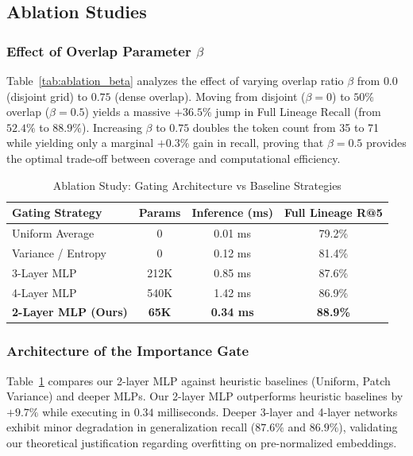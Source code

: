 \documentclass[journal]{IEEEtran}
\begin{document}
\subsection{Ablation Studies}

\subsubsection{Effect of Overlap Parameter $\beta$}
Table~\ref{tab:ablation_beta} analyzes the effect of varying overlap ratio $\beta$ from $0.0$ (disjoint grid) to $0.75$ (dense overlap). Moving from disjoint ($\beta=0$) to $50\%$ overlap ($\beta=0.5$) yields a massive $+36.5\%$ jump in Full Lineage Recall (from $52.4\%$ to $88.9\%$). Increasing $\beta$ to $0.75$ doubles the token count from 35 to 71 while yielding only a marginal $+0.3\%$ gain in recall, proving that $\beta = 0.5$ provides the optimal trade-off between coverage and computational efficiency.

\begin{table}[t]
\centering
\caption{Ablation Study: Gating Architecture vs Baseline Strategies}
\label{tab:ablation_gating}
\begin{tabular}{lccc}
\toprule
\textbf{Gating Strategy} & \textbf{Params} & \textbf{Inference (ms)} & \textbf{Full Lineage R@5} \\
\midrule
Uniform Average & 0 & 0.01 ms & 79.2\% \\
Variance / Entropy & 0 & 0.12 ms & 81.4\% \\
3-Layer MLP & 212K & 0.85 ms & 87.6\% \\
4-Layer MLP & 540K & 1.42 ms & 86.9\% \\
\textbf{2-Layer MLP (Ours)} & \textbf{65K} & \textbf{0.34 ms} & \textbf{88.9\%} \\
\bottomrule
\end{tabular}
\end{table}

\subsubsection{Architecture of the Importance Gate}
Table~\ref{tab:ablation_gating} compares our 2-layer MLP against heuristic baselines (Uniform, Patch Variance) and deeper MLPs. Our 2-layer MLP outperforms heuristic baselines by $+9.7\%$ while executing in $0.34$ milliseconds. Deeper 3-layer and 4-layer networks exhibit minor degradation in generalization recall ($87.6\%$ and $86.9\%$), validating our theoretical justification regarding overfitting on pre-normalized embeddings.
\end{document}
